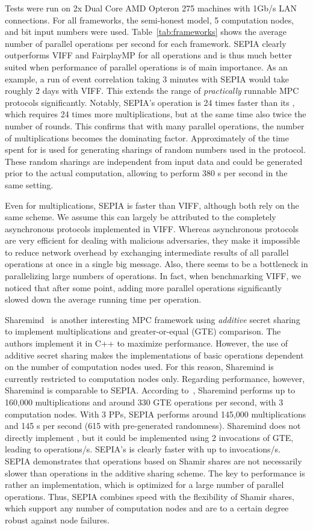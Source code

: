 \documentclass[letterpaper,11pt,onecolumn,titlepage]{article}
\begin{document}
Tests were run on 2x Dual Core AMD Opteron 275 machines with 1Gb/s LAN connections. For all frameworks, the semi-honest model, 5 computation nodes, and  bit input numbers were used. Table~\ref{tab:frameworks} shows the average number of parallel operations per second for each framework.
SEPIA clearly outperforms VIFF and FairplayMP for all operations and is thus much better suited when performance of parallel operations is of main importance.
As an example, a run of event correlation taking 3 minutes with SEPIA would take roughly 2 days with VIFF. This extends the range of \emph{practically} runnable MPC protocols significantly. Notably, SEPIA's  operation is 24 times faster than its , which requires 24 times more multiplications, but at the same time also twice the number of rounds. This confirms that with many parallel operations, the number of multiplications becomes the dominating factor.
Approximately  of the time spent for  is used for generating sharings of random numbers used in the protocol. These random sharings are independent from input data and could be generated prior to the actual computation, allowing to perform 380 s per second in the same setting.



Even for multiplications, SEPIA is faster than VIFF, although both rely on the same scheme. We assume this can largely be attributed to the completely asynchronous protocols implemented in VIFF. Whereas asynchronous protocols are very efficient for dealing with malicious adversaries, they make it impossible
to reduce network overhead by exchanging intermediate results of all parallel operations at once in a single big message. Also, there seems to be a bottleneck in parallelizing large numbers of operations. In fact, when benchmarking VIFF, we noticed that after some point, adding more parallel operations significantly slowed down the average running time per operation. 

Sharemind~\cite{Sharemind} is another interesting MPC framework using \emph{additive} secret sharing to implement multiplications and greater-or-equal (GTE) comparison. The authors implement it in C++ to maximize performance. However, the use of additive secret sharing makes the implementations of basic operations dependent on the number of computation nodes used. For this reason, Sharemind is currently restricted to  computation nodes only. Regarding performance, however, Sharemind is comparable to SEPIA. According to~\cite{Sharemind}, Sharemind performs up to 160,000 multiplications and around 330 GTE operations per second, with 3 computation nodes. With 3 PPs, SEPIA performs around 145,000 multiplications and 145 s per second (615 with pre-generated randomness). Sharemind does not directly implement , but it could be implemented using 2 invocations of GTE, leading to  operations/s. SEPIA's  is clearly faster with up to  invocations/s.
SEPIA demonstrates that operations based on Shamir shares are not necessarily slower than operations in the additive sharing scheme. The key to performance is rather an implementation, which is optimized for a large number of parallel operations. Thus, SEPIA combines speed with the flexibility of Shamir shares, which support any number of computation nodes and are to a certain degree robust against node failures. 
\end{document}
